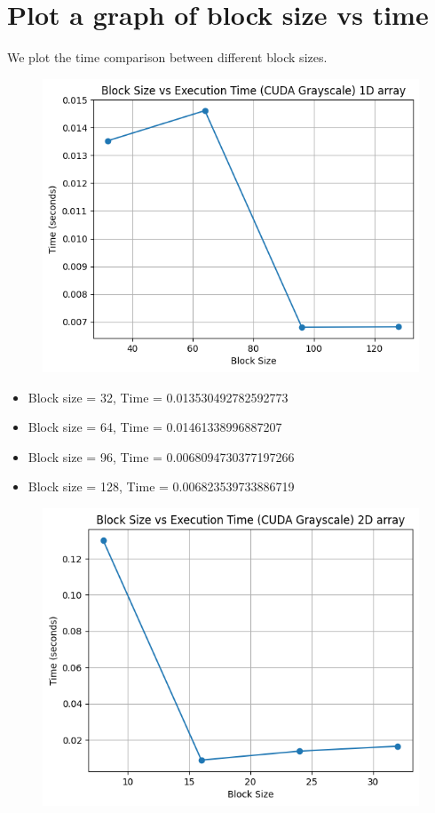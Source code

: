 \documentclass{article}
\begin{document}
\section{Plot a graph of block size vs time}

We plot the time comparison between different block sizes. 
\begin{figure}[H]
    \centering
    \includegraphics[width=0.76\linewidth]{output3.png}
\end{figure}

\begin{itemize}
    \item Block size = 32, Time = 0.013530492782592773
    \item Block size = 64, Time = 0.01461338996887207
    \item Block size = 96, Time = 0.0068094730377197266
    \item Block size = 128, Time = 0.006823539733886719
\end{itemize}


\begin{figure}[H]
    \centering
    \includegraphics[width=0.76\linewidth]{output4.png}
\end{figure}
\end{document}
